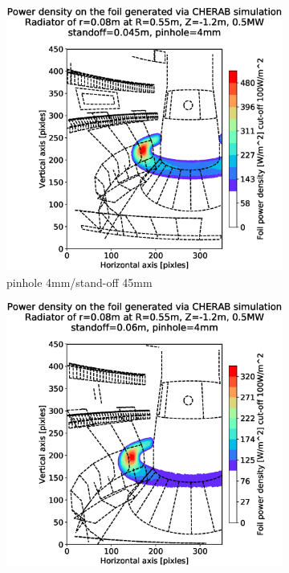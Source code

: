 \begin{figure}[!ht]
     \centering
     \begin{subfigure}{0.31\textwidth}
         \centering
         \includegraphics[trim={85 25 57 80},clip,width=\textwidth]{Chapters/chapter2/figs/measured_power_4_45radiator_R0.55_Z-1.2_r0.08.stl.eps}
         \caption{pinhole 4mm/stand-off 45mm}
         \label{fig:4_45}
     \end{subfigure}
     \hfill
     \begin{subfigure}{0.31\textwidth}
         \centering
         \includegraphics[trim={85 25 57 80},clip,width=\textwidth]{Chapters/chapter2/figs/measured_power_4_60radiator_R0.55_Z-1.2_r0.08.stl.eps}

\end{subfigure}
\end{figure}
